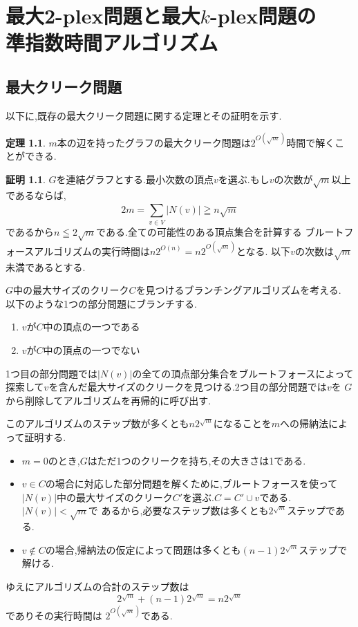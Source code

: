 \documentclass{thesis}
\theoremstyle{definition}
\newtheorem{theorem}{定理}[chapter]
\newtheorem*{prf*}{証明}
\begin{document}

\newpage

\chapter{最大2-plex問題と最大$k$-plex問題の \\ 準指数時間アルゴリズム}

\section{最大クリーク問題}

以下に,既存の最大クリーク問題に関する定理とその証明を示す. \cite{fomin2010exact}
\begin{theorem} \label{theorem:1}
$m$本の辺を持ったグラフの最大クリーク問題は$2^{O(\sqrt{m})}$時間で解くことができる.
\begin{prf*}
$G$を連結グラフとする.最小次数の頂点$v$を選ぶ.もし$v$の次数が$\sqrt{m}$以上であるならば,
\[ 2m = \sum_{v \in V}^{} |N(v)| \geqq n\sqrt{m} \]
であるから$n \leqq 2\sqrt{m}$である.全ての可能性のある頂点集合を計算する
ブルートフォースアルゴリズムの実行時間は$n2^{O(n)} = n2^{O(\sqrt{m})}$となる.
以下$v$の次数は$\sqrt{m}$未満であるとする.

$G$中の最大サイズのクリーク$C$を見つけるブランチングアルゴリズムを考える.
以下のような1つの部分問題にブランチする.
\begin{enumerate}
 \item $v$が$C$中の頂点の一つである
 \item $v$が$C$中の頂点の一つでない
\end{enumerate}
1つ目の部分問題では$|N(v)|$の全ての頂点部分集合をブルートフォースによって
探索して$v$を含んだ最大サイズのクリークを見つける.2つ目の部分問題では$v$を
$G$から削除してアルゴリズムを再帰的に呼び出す.

このアルゴリズムのステップ数が多くとも$n2^{\sqrt{m}}$になることを$m$への帰納法によって証明する.
\begin{itemize}
 \item $m = 0$のとき,$G$はただ1つのクリークを持ち,その大きさは1である.	
 \item $v \in C$の場合に対応した部分問題を解くために,ブルートフォースを使って
$|N(v)|$中の最大サイズのクリーク$C'$を選ぶ.$C = C'  \cup  v$である.$|N(v)| < \sqrt{m}$で
あるから,必要なステップ数は多くとも$2^{\sqrt{m}}$ステップである.
 \item $v \notin C$の場合,帰納法の仮定によって問題は多くとも$(n - 1)2^{\sqrt{m}}$ステップで解ける.
\end{itemize}
ゆえにアルゴリズムの合計のステップ数は
\[  2^{\sqrt{m}} +  (n - 1)2^{\sqrt{m}} = n2^{\sqrt{m}} \]
でありその実行時間は $2^{O(\sqrt{m})}$である. 
\end{prf*}
\end{theorem}
\end{document}
